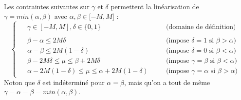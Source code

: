 \documentclass[a4paper,12pt]{article}
\begin{document}
\begin {enumerate}
{    Les contraintes suivantes sur $\gamma$ et $\delta$ permettent la linéarisation de $ \gamma = min(\alpha, \beta)$ avec $\alpha, \beta \in \lbrack -M, M \rbrack$ : 
    \begin{equation*}
        \begin{cases}
            \begin{alignedat}{2}
                &\gamma \in [-M,M], \delta \in \lbrace 0,1 \rbrace && \quad \text{(domaine de définition)} \\  \\ 
                &\beta - \alpha \leq 2M \delta && \quad \text{(impose } \delta = 1 \text{ si }  \beta > \alpha \text{)}\\
                &\alpha - \beta \leq 2M(1-\delta) && \quad \text{(impose } \delta = 0 \text{ si }  \beta < \alpha \text{)}\\
                &\beta - 2M\delta \leq \mu \leq \beta + 2M\delta && \quad \text{(impose } \gamma = \beta \text{ si }  \beta < \alpha \text{)}\\
                &\alpha - 2M(1-\delta) \leq \mu \leq \alpha + 2M(1-\delta) && \quad \text{(impose } \gamma = \alpha \text{ si }  \beta > \alpha \text{)}
            \end{alignedat}
        \end{cases}
    \end{equation*}
    Noton que $\delta$ est indéterminé pour $\alpha = \beta$, mais qu'on a tout de même $\gamma = \alpha = \beta = min(\alpha, \beta)$.
    
}
\end{enumerate}
\end{document}
